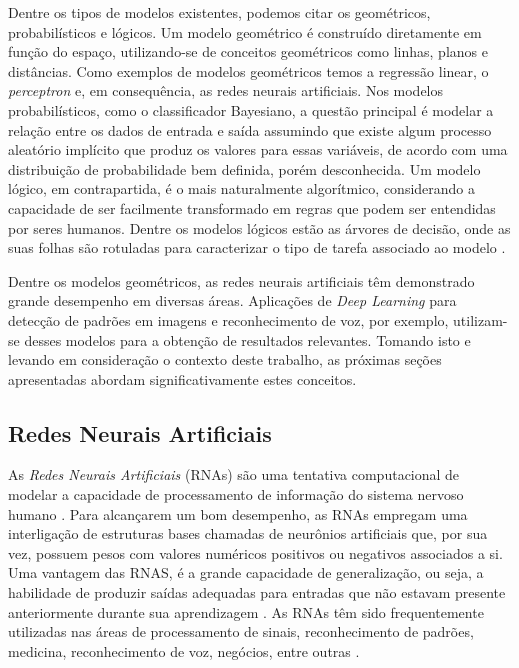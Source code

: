 Dentre os tipos de modelos existentes, podemos citar os geométricos, probabilísticos e lógicos. Um modelo geométrico é construído diretamente em função do espaço, utilizando-se de conceitos geométricos como linhas, planos e distâncias. Como exemplos de modelos geométricos temos a regressão linear, o \emph{perceptron} e, em consequência, as redes neurais artificiais. Nos modelos probabilísticos, como o classificador Bayesiano, a questão principal é modelar a relação entre os dados de entrada e saída assumindo que existe algum processo aleatório implícito que produz os valores para essas variáveis, de acordo com uma distribuição de probabilidade bem definida, porém desconhecida. Um modelo lógico, em contrapartida, é o mais naturalmente algorítmico, considerando a capacidade de ser facilmente transformado em regras que podem ser entendidas por seres humanos. Dentre os modelos lógicos estão as árvores de decisão, onde as suas folhas são rotuladas para caracterizar o tipo de tarefa associado ao modelo \cite{flach}.

Dentre os modelos geométricos, as redes neurais artificiais têm demonstrado grande desempenho em diversas áreas. Aplicações de \emph{Deep Learning} para detecção de padrões em imagens e reconhecimento de voz, por exemplo, utilizam-se desses modelos para a obtenção de resultados relevantes. Tomando isto e levando em consideração o contexto deste trabalho, as próximas seções apresentadas abordam significativamente estes conceitos.


\subsection{Redes Neurais Artificiais}
\label{subsec:rna}

As \emph{Redes Neurais Artificiais} (RNAs) são uma tentativa computacional de modelar a capacidade de processamento de informação do sistema nervoso humano \cite{rojas}. Para alcançarem um bom desempenho, as RNAs empregam uma interligação de estruturas bases chamadas de neurônios artificiais que, por sua vez, possuem pesos com valores numéricos positivos ou negativos associados a si. Uma vantagem das RNAS, é a grande capacidade de generalização, ou seja, a habilidade de produzir saídas adequadas para entradas que não estavam presente anteriormente durante sua aprendizagem \cite{haykin}. As RNAs têm sido frequentemente utilizadas nas áreas de processamento de sinais, reconhecimento de padrões, medicina, reconhecimento de voz, negócios, entre outras \cite{fausett}.

